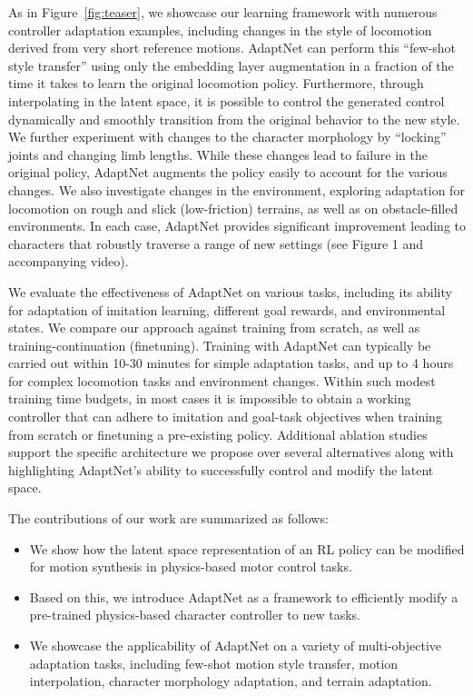 As in Figure~\ref{fig:teaser}, we showcase our learning framework with numerous controller adaptation examples, including changes in the style of locomotion derived from very short reference motions.  AdaptNet can perform this ``few-shot style transfer'' using only the embedding layer augmentation in a fraction of the time it takes to learn the original locomotion policy.  Furthermore, through interpolating in the latent space, 
it is possible to control the generated control dynamically and smoothly transition from the original behavior to the new style. 
 We further experiment with changes to the character morphology by ``locking'' joints and changing limb lengths.  While these changes lead to failure in the original policy, AdaptNet augments the policy easily to account for the various changes.  We also investigate changes in the environment, exploring adaptation for locomotion on rough and slick (low-friction) terrains, as well as on obstacle-filled environments.  In each case, AdaptNet provides significant 
improvement leading to characters that robustly traverse a range of new settings (see Figure 1 and accompanying video).





We evaluate the effectiveness of AdaptNet on various tasks, %
including its ability for adaptation of imitation learning, different goal rewards, and environmental states.  We compare our approach %
against training from scratch, as well as training-continuation (finetuning). 
Training with AdaptNet can typically be carried out within 10-30 minutes for simple adaptation tasks, and up to 4 hours for complex locomotion tasks and environment changes.
Within such modest training time budgets, in most cases it is impossible to obtain a working controller that can adhere to imitation and goal-task objectives when training from scratch or finetuning a pre-existing policy. 
Additional ablation studies support the specific architecture we propose over several alternatives along with highlighting AdaptNet's ability to successfully control and modify the latent space. 



The contributions of our work are summarized as follows:
\begin{itemize}

\item We show how the latent space representation of an RL policy can be modified for motion
synthesis in physics-based motor control tasks.  

\item  Based on this, we introduce AdaptNet as a framework to efficiently modify a pre-trained physics-based character controller to new tasks. 

\item  We showcase the applicability of AdaptNet on a variety of multi-objective adaptation tasks, including few-shot motion style transfer, motion interpolation, character morphology adaptation, and terrain adaptation.

\end{itemize}


